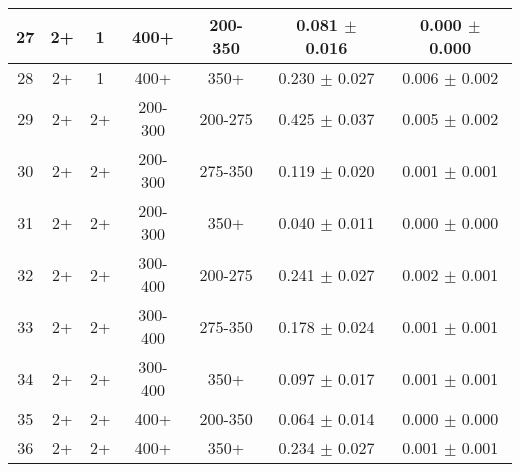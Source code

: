\begin{table}[htbp]
\begin{centering}
\begin{lrbox}{\closureBox}
\begin{tabular}{|c|c|c|c|c||c|c|}
             27 &              2+ &               1 &            400+ &         200-350 &   0.081 $\pm$ 0.016 & 0.000 $\pm$ 0.000 \\
 \hline                                                                                      
             28 &              2+ &               1 &            400+ &            350+ &   0.230 $\pm$ 0.027 & 0.006 $\pm$ 0.002 \\
 \hline                                                                                      
             29 &              2+ &              2+ &         200-300 &         200-275 &   0.425 $\pm$ 0.037 & 0.005 $\pm$ 0.002 \\
 \hline                                                                                      
             30 &              2+ &              2+ &         200-300 &         275-350 &   0.119 $\pm$ 0.020 & 0.001 $\pm$ 0.001 \\
 \hline                                                                                      
             31 &              2+ &              2+ &         200-300 &            350+ &   0.040 $\pm$ 0.011 & 0.000 $\pm$ 0.000 \\
 \hline                                                                                      
             32 &              2+ &              2+ &         300-400 &         200-275 &   0.241 $\pm$ 0.027 & 0.002 $\pm$ 0.001 \\
 \hline                                                                                      
             33 &              2+ &              2+ &         300-400 &         275-350 &   0.178 $\pm$ 0.024 & 0.001 $\pm$ 0.001 \\
 \hline                                                                                      
             34 &              2+ &              2+ &         300-400 &            350+ &   0.097 $\pm$ 0.017 & 0.001 $\pm$ 0.001 \\
 \hline                                                                                      
             35 &              2+ &              2+ &            400+ &         200-350 &   0.064 $\pm$ 0.014 & 0.000 $\pm$ 0.000 \\
 \hline                                                                                      
             36 &              2+ &              2+ &            400+ &            350+ &   0.234 $\pm$ 0.027 & 0.001 $\pm$ 0.001 \\
 \hline
\end{tabular}
\end{lrbox}
\scalebox{0.80}{\usebox{\closureBox}}
\par\end{centering}
\end{table}
